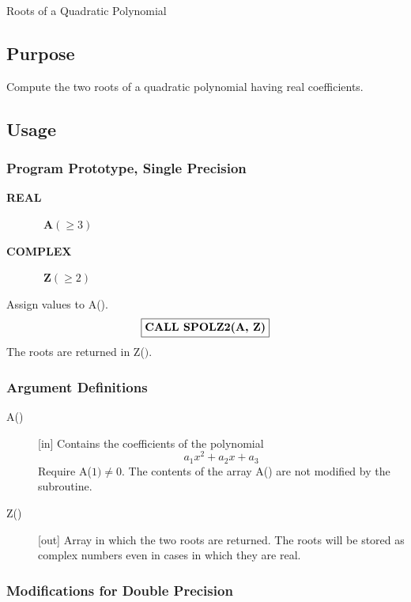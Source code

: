 \documentclass[twoside]{MATH77}
\begin{document}
 Roots of a Quadratic Polynomial


\subsection{Purpose}

Compute the two roots of a quadratic polynomial having real coefficients.

\subsection{Usage}

\subsubsection{Program Prototype, Single Precision}

\begin{description}
\item[\bf REAL]  \ {\bf A}$(\geq 3)$

\item[\bf COMPLEX]  \ {\bf Z}$(\geq 2)$
\end{description}

Assign values to A().
$$
\fbox{{\bf CALL SPOLZ2(A, Z)}}
$$
The roots are returned in Z($).$

\subsubsection{Argument Definitions}

\begin{description}
\item[A()]  [in] Contains the coefficients of the polynomial%
\begin{equation*}
a_1x^2+a_2x+a_3
\end{equation*}
Require A($1)\neq 0$. The contents of the array A() are not modified by the
subroutine.

\item[Z()]  [out] Array in which the two roots are returned. The roots will
be stored as complex numbers even in cases in which they are real.
\end{description}

\subsubsection{Modifications for Double Precision}
\end{document}
